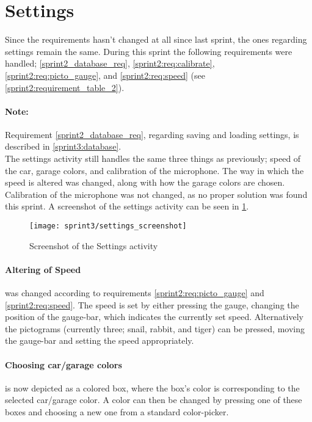 \section{Settings}

Since the requirements hasn't changed at all since last sprint, the ones regarding settings remain the same.
During this sprint the following requirements were handled; \ref{sprint2_database_req}, \ref{sprint2:req:calibrate}, \ref{sprint2:req:picto_gauge}, and \ref{sprint2:req:speed} (see \cref{sprint2:requirement_table_2}).

\paragraph{Note:} Requirement \ref{sprint2_database_req}, regarding saving and loading settings, is described in \ref{sprint3:database}.\\

\noindent
The settings activity still handles the same three things as previously; speed of the car, garage colors, and calibration of the microphone.
The way in which the speed is altered was changed, along with how the garage colors are chosen.
Calibration of the microphone was not changed, as no proper solution was found this sprint.
A screenshot of the settings activity can be seen in \cref{sprint3:settings:screenshot}.

\begin{figure}
\texttt{[image: sprint3/settings\_screenshot]}
\caption{Screenshot of the Settings activity}
\label{sprint3:settings:screenshot}
\end{figure}

\paragraph{Altering of Speed} was changed according to requirements \ref{sprint2:req:picto_gauge} and \ref{sprint2:req:speed}.
The speed is set by either pressing the gauge, changing the position of the gauge-bar, which indicates the currently set speed.
Alternatively the pictograms (currently three; snail, rabbit, and tiger) can be pressed, moving the gauge-bar and setting the speed appropriately.

\paragraph{Choosing car/garage colors} is now depicted as a colored box, where the box's color is corresponding to the selected car/garage color.
A color can then be changed by pressing one of these boxes and choosing a new one from a standard color-picker.